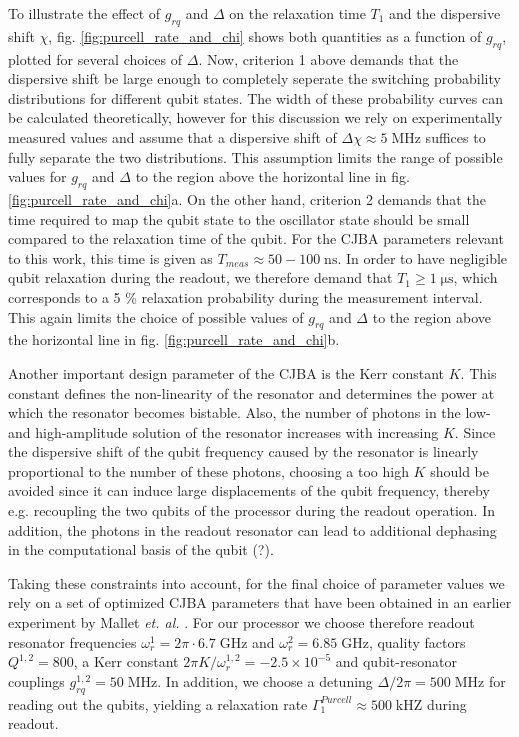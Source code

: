 To illustrate the effect of $g_{rq}$ and $\Delta$ on the relaxation time $T_1$ and the dispersive shift $\chi$, fig. \ref{fig:purcell_rate_and_chi} shows both quantities as a function of $g_{rq}$, plotted for several choices of $\Delta$. Now, criterion 1 above demands that the dispersive shift be large enough to completely seperate the switching probability distributions for different qubit states. The width of these probability curves can be calculated theoretically, however for this discussion we rely on experimentally measured values and assume that a dispersive shift of $\Delta \chi \approx 5\;\mathrm{MHz}$ suffices to fully separate the two distributions. This assumption limits the range of possible values for $g_{rq}$ and $\Delta$ to the region above the horizontal line in fig. \ref{fig:purcell_rate_and_chi}a. On the other hand, criterion 2 demands that the time required to map the qubit state to the oscillator state should be small compared to the relaxation time of the qubit. For the CJBA parameters relevant to this work, this time is given as $T_{meas}\approx 50-100\;\mathrm{ns}$. In order to have negligible qubit relaxation during the readout, we therefore demand that $T_1 \ge 1\;\mathrm{\mu s}$, which corresponds to a 5 \% relaxation probability during the measurement interval. This again limits the choice of possible values of $g_{rq}$ and $\Delta$ to the region above the horizontal line in fig. \ref{fig:purcell_rate_and_chi}b. 

\smallskip

Another important design parameter of the CJBA is the Kerr constant $K$. This constant defines the non-linearity of the resonator and determines the power at which the resonator becomes bistable. Also, the number of photons in the low- and high-amplitude solution of the resonator increases with increasing $K$. Since the dispersive shift of the qubit frequency caused by the resonator is linearly proportional to the number of these photons, choosing a too high $K$ should be avoided since it can induce large displacements of the qubit frequency, thereby e.g. recoupling the two qubits of the processor during the readout operation. In addition, the photons in the readout resonator can lead to additional dephasing in the computational basis of the qubit (?).

\smallskip

Taking these constraints into account, for the final choice of parameter values we rely on a set of optimized CJBA parameters that have been obtained in an earlier experiment by Mallet {\it et. al.} \citep{mallet_single-shot_2009}. For our processor we choose therefore readout resonator frequencies $\omega_r^1 = 2\pi \cdot 6.7 \;\mathrm{GHz}$ and $\omega_r^2 = 6.85\;\mathrm{GHz}$, quality factors $Q^{1,2}=800$, a Kerr constant $2\pi K/\omega_r^{1,2}=-2.5\times 10^{-5}$ and qubit-resonator couplings $g_{rq}^{1,2}=50\;\mathrm{MHz}$. In addition, we choose a detuning $\Delta/2\pi = 500\;\mathrm{MHz}$ for reading out the qubits, yielding a relaxation rate $\Gamma^{Purcell}_1\approx 500\;\mathrm{kHZ}$ during readout.

